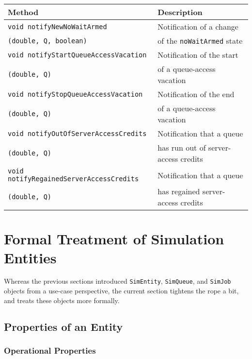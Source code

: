 \documentclass[12pt]{book}
\begin{document}
\begin{tabular}{|l|l|}
  \hline
  {\bf Method} & {\bf Description} \\
  \hline
  \lstinline[basicstyle=\footnotesize]!void notifyNewNoWaitArmed!
  & Notification of a change 
  \\
  \lstinline[basicstyle=\footnotesize]!(double, Q, boolean)!
  & of the \lstinline|noWaitArmed| state
  \\
  \hline
  \lstinline[basicstyle=\footnotesize]|void notifyStartQueueAccessVacation|
  & Notification of the start
  \\
  \lstinline[basicstyle=\footnotesize]|(double, Q)|
  & of a queue-access vacation
  \\
  \hline
  \lstinline[basicstyle=\footnotesize]|void notifyStopQueueAccessVacation|
  & Notification of the end
  \\
  \lstinline[basicstyle=\footnotesize]|(double, Q)|
  & of a queue-access vacation
  \\
  \hline
  \lstinline[basicstyle=\footnotesize]|void notifyOutOfServerAccessCredits|
  & Notification that a queue
  \\
  \lstinline[basicstyle=\footnotesize]|(double, Q)|
  & has run out of server-access credits
  \\
  \hline
  \lstinline[basicstyle=\footnotesize]|void notifyRegainedServerAccessCredits|
  & Notification that a queue
  \\
  \lstinline[basicstyle=\footnotesize]|(double, Q)|
  & has regained server-access credits
  \\
  \hline
\end{tabular}

\section{Formal Treatment of Simulation Entities}

Whereas the previous sections introduced \lstinline-SimEntity-, \lstinline-SimQueue-,
  and \lstinline-SimJob- objects from a use-case perspective,
  the current section tightens the rope a bit,
  and treats these objects more formally.

\subsection{Properties of an Entity}

\subsubsection{Operational Properties}
\end{document}
